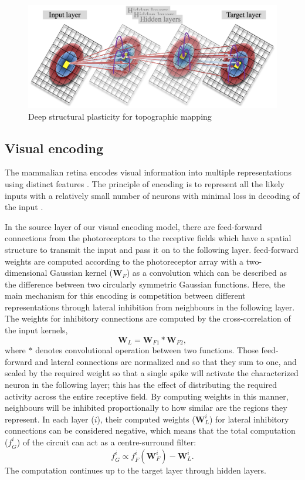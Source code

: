 \documentclass[letterpaper, 10 pt, conference]{ieeeconf}  %
\begin{document}
\begin{figure}[tbh]
    \centering
    \includegraphics[width=0.90\linewidth, trim=0cm 0cm 0cm 0cm, clip=true]{DSP_n}
    \caption{Deep structural plasticity for topographic mapping}
    \label{fig:dsp}
\end{figure}

\subsection{Visual encoding}
The mammalian retina encodes visual information into multiple representations using distinct features \cite{roska2014retina}. The principle of encoding is to represent all the likely inputs with a relatively small number of neurons with minimal loss in decoding of the input \cite{field1994goal}.

In the source layer of our visual encoding model, there are feed-forward connections from the photoreceptors to the receptive fields which have a spatial structure to transmit the input and pass it on to the following layer.
feed-forward weights are computed according to the photoreceptor array with a two-dimensional Gaussian kernel ($\mathbf{W}_F$) as a convolution which can be described as the difference between two circularly symmetric
Gaussian functions.
Here, the main mechanism for this encoding is competition between different representations through lateral inhibition from neighbours in the following layer.
The weights for inhibitory connections are computed by the cross-correlation of the input kernels,
%
\begin{equation}
    \mathbf{W}_{L}  = \mathbf{W}_{F1} \ast \mathbf{W}_{F2} ,
\end{equation}
%
where $\ast$ denotes convolutional operation between two functions.
Those feed-forward and lateral connections are normalized and so that they sum to one, and scaled by the required weight so that a single spike will activate the characterized neuron in the following layer; 
this has the effect of distributing the required activity across the entire receptive field. 
By computing weights in this manner, neighbours will be inhibited proportionally to how similar are the regions they represent. 
In each layer ($i$), their computed weights ($\mathbf{W}_L^i$) for lateral inhibitory connections can be considered negative, which means that the total computation ($\mathit{f}_G^i$) of the circuit can act as a centre-surround filter:
%
\begin{equation}
    \mathit{f}_G^i  \varpropto \mathit{f}^i_{F}(\mathbf{W}^i_{F}) - \mathbf{W}_{L}^i .
\end{equation}
%
The computation continues up to the target layer through hidden layers.
\end{document}
